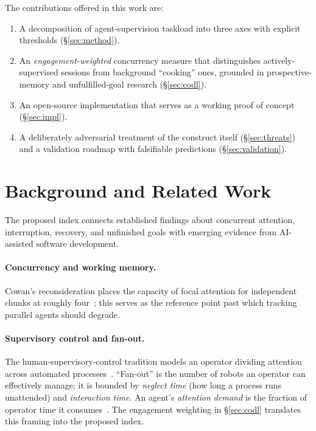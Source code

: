 \documentclass[10pt,twocolumn]{article}
\begin{document}
The contributions offered in this work are:
\begin{enumerate}
  \item A decomposition of agent-supervision taskload into three axes with
  explicit thresholds (\S\ref{sec:method}).
  \item An \emph{engagement-weighted} concurrency measure that distinguishes
  actively-supervised sessions from background ``cooking'' ones, grounded in
  prospective-memory and unfulfilled-goal research (\S\ref{sec:codl}).
  \item An open-source implementation that
  serves as a working proof of concept~\cite{acsrepo} (\S\ref{sec:impl}).
  \item A deliberately adversarial treatment of the construct itself
  (\S\ref{sec:threats}) and a validation roadmap with falsifiable predictions
  (\S\ref{sec:validation}).
\end{enumerate}

\section{Background and Related Work}
The proposed index connects established findings about concurrent attention,
interruption, recovery, and unfinished goals with emerging evidence from
AI-assisted software development.

\paragraph{Concurrency and working memory.} Cowan's reconsideration places the
capacity of focal attention for independent chunks at roughly
four~\cite{cowan2001}; this serves as the reference point past which tracking
parallel agents should degrade.

\paragraph{Supervisory control and fan-out.} The human-supervisory-control
tradition models an operator dividing attention across automated
processes~\cite{sheridan1992}. ``Fan-out'' is the number of robots an operator
can effectively manage; it is bounded by \emph{neglect time} (how long a process
runs unattended) and \emph{interaction time}. An agent's \emph{attention
demand} is the fraction of operator time it
consumes~\cite{cummings2008,crandall2007}. The engagement weighting in
\S\ref{sec:codl} translates this framing into the proposed index.
\end{document}
